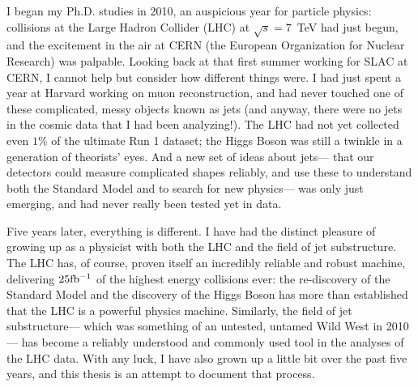 
I began my Ph.D. studies in 2010, an auspicious year for particle physics: collisions at the Large Hadron Collider (LHC) at $\sqrt{s} = 7$~TeV had just begun, and the excitement in the air at CERN (the European Organization for Nuclear Research) was palpable. Looking back at that first summer working for SLAC at CERN, I cannot help but consider how different things were. I had just spent a year at Harvard working on muon reconstruction, and had never touched one of these complicated, messy objects known as jets (and anyway, there were no jets in the cosmic data that I had been analyzing!). The LHC had not yet collected even $1\%$ of the ultimate Run 1 dataset; the Higgs Boson was still a twinkle in a generation of theorists' eyes. And a new set of ideas about jets--- that our detectors could measure complicated shapes reliably, and use these to understand both the Standard Model and to search for new physics--- was only just emerging, and had never really been tested yet in data. 

Five years later, everything is different. I have had the distinct pleasure of growing up as a physicist with both the LHC and the field of jet substructure. The LHC has, of course, proven itself an incredibly reliable and robust machine, delivering $25 \mbox{fb$^{-1}$}$ of the highest energy collisions ever: the re-discovery of the Standard Model and the discovery of the Higgs Boson has more than established that the LHC is a powerful physics machine. Similarly, the field of jet substructure--- which was something of an untested, untamed Wild West in 2010--- has become a reliably understood  and commonly used tool in the analyses of the LHC data. With any luck, I have also grown up a little bit over the past five years, and this thesis is an attempt to document that process.